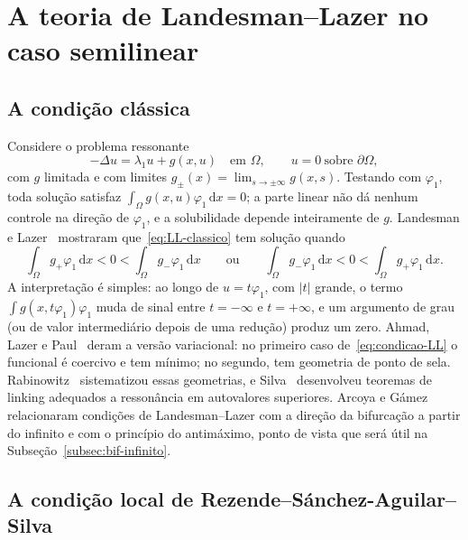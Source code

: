 \documentclass[11pt,a4paper]{article}
\theoremstyle{plain}
\theoremstyle{definition}
\theoremstyle{remark}
\newcommand{\abs}[1]{\lvert #1\rvert}
\newcommand{\dx}{\,\mathrm{d}x}
\begin{document}
\section{A teoria de Landesman--Lazer no caso semilinear}\label{sec:LL}

\subsection{A condição clássica}

Considere o problema ressonante
\begin{equation}\label{eq:LL-classico}
-\Delta u=\lambda_1u+g(x,u)\quad\text{em }\Omega,\qquad u=0\ \text{sobre }\partial\Omega,
\end{equation}
com $g$ limitada e com limites $g_\pm(x)=\lim_{s\to\pm\infty}g(x,s)$. Testando
com $\varphi_1$, toda solução satisfaz $\int_\Omega g(x,u)\varphi_1\dx=0$; a
parte linear não dá nenhum controle na direção de $\varphi_1$, e a
solubilidade depende inteiramente de $g$. Landesman e
Lazer~\cite{LandesmanLazer1970} mostraram que~\eqref{eq:LL-classico} tem solução
quando
\begin{equation}\label{eq:condicao-LL}
\int_\Omega g_+\varphi_1\dx<0<\int_\Omega g_-\varphi_1\dx
\qquad\text{ou}\qquad
\int_\Omega g_-\varphi_1\dx<0<\int_\Omega g_+\varphi_1\dx .
\end{equation}
A interpretação é simples: ao longo de $u=t\varphi_1$, com $\abs{t}$ grande, o
termo $\int g(x,t\varphi_1)\varphi_1$ muda de sinal entre $t=-\infty$ e
$t=+\infty$, e um argumento de grau (ou de valor intermediário depois de uma
redução) produz um zero. Ahmad, Lazer e Paul~\cite{AhmadLazerPaul1976}
deram a versão variacional: no primeiro caso de~\eqref{eq:condicao-LL} o
funcional é coercivo e tem mínimo; no segundo, tem geometria de ponto de sela.
Rabinowitz~\cite{Rabinowitz1986} sistematizou essas geometrias, e
Silva~\cite{Silva1991} desenvolveu teoremas de linking adequados a ressonância
em autovalores superiores. Arcoya e Gámez~\cite{ArcoyaGamez2001} relacionaram
condições de Landesman--Lazer com a direção da bifurcação a partir do infinito
e com o princípio do antimáximo, ponto de vista que será útil na
Subseção~\ref{subsec:bif-infinito}.

\subsection{A condição local de Rezende--Sánchez-Aguilar--Silva}\label{subsec:LL-local}
\end{document}
